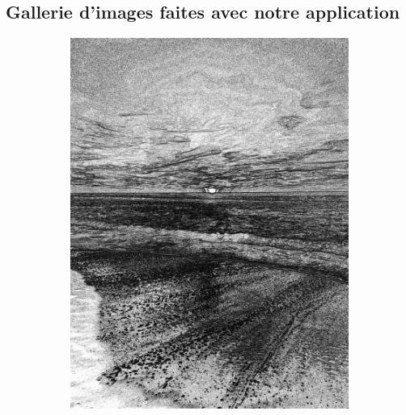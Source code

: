 \documentclass[12pt, a4paper]{article}
\begin{document}
  \subsection{Gallerie d'images faites avec notre application}
    \begin{figure}[!h]
      \centering 
      \begin{subfigure}[b]{0.3\textwidth}
          \includegraphics[width=1\textwidth]{report_src/art/depressing_sunset.jpeg}
      \end{subfigure}
      \begin{subfigure}[b]{0.3\textwidth}

\end{subfigure}
\end{figure}
\end{document}
